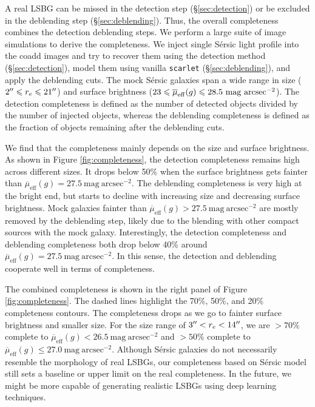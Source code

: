 \documentclass[twocolumn,astrosymb,twocolappendix]{aastex631}
\newcommand{\sbunit}{\mathrm{mag\ arcsec}^{-2}}
\newcommand{\sbeff}{\overline{\mu}_{\mathrm{eff}}(g)}
\newcommand{\code}[1]{\texttt{#1}}
\newcommand{\sersic}{S\'ersic}
\begin{document}
\begin{CJK*}{UTF8}{gbsn}
A real LSBG can be missed in the detection step (\S \ref{sec:detection}) or be excluded in the deblending step (\S \ref{sec:deblending}). Thus, the overall completeness combines the detection deblending steps. We perform a large suite of image simulations to derive the completeness. We inject single \sersic{} light profile \citep{Sersic1963} into the coadd images and try to recover them using the detection method (\S\ref{sec:detection}), model them using vanilla \code{scarlet} (\S\ref{sec:deblending}), and apply the deblending cuts. The mock \sersic{} galaxies span a wide range in size ($2\mbox{$^{\prime\prime}$} \leqslant r_{e} \leqslant 21\mbox{$^{\prime\prime}$}$) and surface brightness ($23 \leqslant \overline{\mu}_{\rm eff}(g) \leqslant 28.5\ \mathrm{mag\ arcsec^{-2}}$). The detection completeness is defined as the number of detected objects divided by the number of injected objects, whereas the deblending completeness is defined as the fraction of objects remaining after the deblending cuts. 

We find that the completeness mainly depends on the size and surface brightness. As shown in Figure \ref{fig:completeness}, the detection completeness remains high across different sizes. It drops below 50\% when the surface brightness gets fainter than $\sbeff = 27.5\ \sbunit$. The deblending completeness is very high at the bright end, but starts to decline with increasing size and decreasing surface brightness. Mock galaxies fainter than $\sbeff > 27.5\ \sbunit$ are mostly removed by the deblending step, likely due to the blending with other compact sources with the mock galaxy. Interestingly, the detection completeness and deblending completeness both drop below 40\% around $\sbeff=27.5\ \sbunit$. In this sense, the detection and deblending cooperate well in terms of completeness. 

The combined completeness is shown in the right panel of Figure \ref{fig:completeness}. The dashed lines highlight the 70\%, 50\%, and 20\% completeness contours. The completeness drops as we go to fainter surface brightness and smaller size. For the size range of $3\mbox{$^{\prime\prime}$} < r_e < 14\mbox{$^{\prime\prime}$}$, we are $>70\%$ complete to $\sbeff < 26.5\ \sbunit$ and $>50\%$ complete to $\sbeff \leqslant 27.0\ \sbunit$. Although \sersic{} galaxies do not necessarily resemble the morphology of real LSBGs, our completeness based on \sersic{} model still sets a baseline or upper limit on the real completeness. In the future, we might be more capable of generating realistic LSBGs using deep learning techniques.


\end{CJK*}
\end{document}
